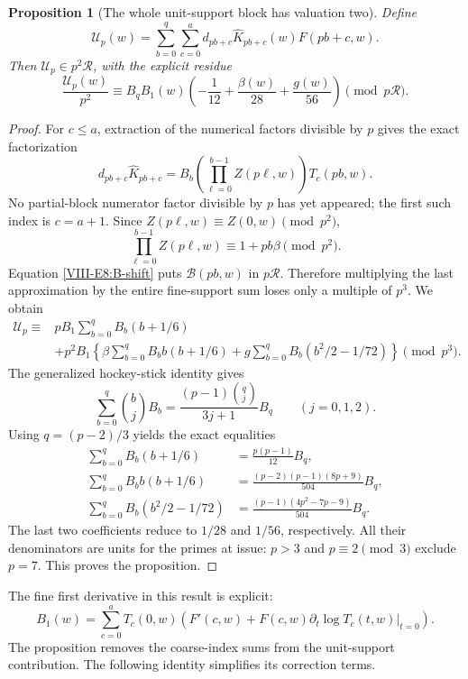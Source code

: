 \documentclass[11pt,letterpaper]{article}
\newtheorem{proposition}[theorem]{Proposition}
\numberwithin{equation}{section}
\begin{document}
\begin{proposition}[The whole unit-support block has valuation two]
\label{VIII-E8:unit-support}
Define
\[
 \mathcal U_p(w)=\sum_{b=0}^q\sum_{c=0}^a
 d_{pb+c}\widehat K_{pb+c}(w)F(pb+c,w).
\]
Then $\mathcal U_p\in p^2\mathcal R$, with the explicit residue
\[
 \boxed{\frac{\mathcal U_p(w)}{p^2}
 \equiv B_q B_1(w)
 \left(-\frac1{12}+\frac{\beta(w)}{28}+\frac{g(w)}{56}\right)
 \pmod{p\mathcal R}.}
\]
\end{proposition}
\begin{proof}
For $c\le a$, extraction of the numerical factors divisible by $p$
gives the exact factorization
\[
 d_{pb+c}\widehat K_{pb+c}
 =B_b\left(\prod_{\ell=0}^{b-1}Z(p\ell,w)\right)T_c(pb,w).
\]
No partial-block numerator factor divisible by $p$ has yet appeared;
the first such index is $c=a+1$.
Since $Z(p\ell,w)\equiv Z(0,w)\pmod{p^2}$,
\[
 \prod_{\ell=0}^{b-1}Z(p\ell,w)\equiv1+pb\beta\pmod{p^2}.
\]
Equation \eqref{VIII-E8:B-shift} puts $\mathcal B(pb,w)$ in $p\mathcal R$.
Therefore multiplying the last approximation by the entire fine-support
sum loses only a multiple of $p^3$. We obtain
\begin{align*}
 \mathcal U_p\equiv {}&
 pB_1\sum_{b=0}^q B_b(b+1/6)\\
 &+p^2B_1\left\{
 \beta\sum_{b=0}^qB_b b(b+1/6)
 +g\sum_{b=0}^qB_b(b^2/2-1/72)\right\}\pmod{p^3}.
\end{align*}
The generalized hockey-stick identity gives
\[
 \sum_{b=0}^q\binom bjB_b
 =\frac{(p-1)\binom qj}{3j+1}B_q\qquad (j=0,1,2).
\]
Using $q=(p-2)/3$ yields the exact equalities
\begin{align*}
 \sum_{b=0}^qB_b(b+1/6)
 &=\frac{p(p-1)}{12}B_q,\\
 \sum_{b=0}^qB_b b(b+1/6)
 &=\frac{(p-2)(p-1)(8p+9)}{504}B_q,\\
 \sum_{b=0}^qB_b(b^2/2-1/72)
 &=\frac{(p-1)(4p^2-7p-9)}{504}B_q.
\end{align*}
The last two coefficients reduce to $1/28$ and $1/56$, respectively.
All their denominators are units for the primes at issue: $p>3$ and
$p\equiv2\pmod3$ exclude $p=7$. This proves the proposition.
\end{proof}

The fine first derivative in this result is explicit:
\[
 B_1(w)=\sum_{c=0}^aT_c(0,w)
 \left(F'(c,w)+F(c,w)
 \left.\partial_t\log T_c(t,w)\right|_{t=0}\right).
\]
The proposition removes the coarse-index sums from the unit-support
contribution. The following identity simplifies its correction terms.
\end{document}
